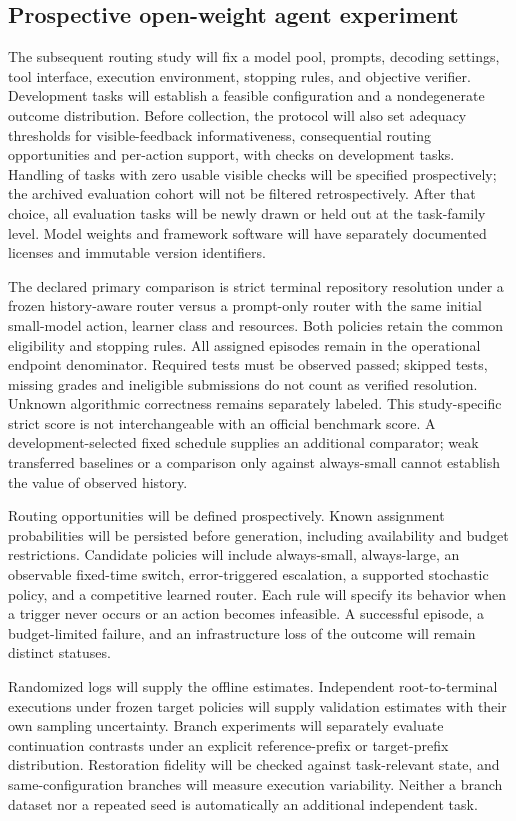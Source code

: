 \subsection{Prospective open-weight agent experiment}
The subsequent routing study will fix a model pool, prompts, decoding settings, tool interface, execution environment, stopping rules, and objective verifier. Development tasks will establish a feasible configuration and a nondegenerate outcome distribution. Before collection, the protocol will also set adequacy thresholds for visible-feedback informativeness, consequential routing opportunities and per-action support, with checks on development tasks. Handling of tasks with zero usable visible checks will be specified prospectively; the archived evaluation cohort will not be filtered retrospectively. After that choice, all evaluation tasks will be newly drawn or held out at the task-family level. Model weights and framework software will have separately documented licenses and immutable version identifiers.

The declared primary comparison is strict terminal repository resolution under a frozen history-aware
router versus a prompt-only router with the same initial small-model action, learner class and resources.
Both policies retain the common eligibility and stopping rules. All assigned episodes remain in the
operational endpoint denominator. Required tests must be observed passed; skipped tests, missing grades
and ineligible submissions do not count as verified resolution. Unknown algorithmic correctness remains
separately labeled. This study-specific strict score is not interchangeable with an official benchmark
score. A development-selected fixed schedule supplies an additional comparator; weak transferred baselines
or a comparison only against always-small cannot establish the value of observed history.

Routing opportunities will be defined prospectively. Known assignment probabilities will be persisted before generation, including availability and budget restrictions. Candidate policies will include always-small, always-large, an observable fixed-time switch, error-triggered escalation, a supported stochastic policy, and a competitive learned router. Each rule will specify its behavior when a trigger never occurs or an action becomes infeasible. A successful episode, a budget-limited failure, and an infrastructure loss of the outcome will remain distinct statuses.

Randomized logs will supply the offline estimates. Independent root-to-terminal executions under frozen target policies will supply validation estimates with their own sampling uncertainty. Branch experiments will separately evaluate continuation contrasts under an explicit reference-prefix or target-prefix distribution. Restoration fidelity will be checked against task-relevant state, and same-configuration branches will measure execution variability. Neither a branch dataset nor a repeated seed is automatically an additional independent task.

